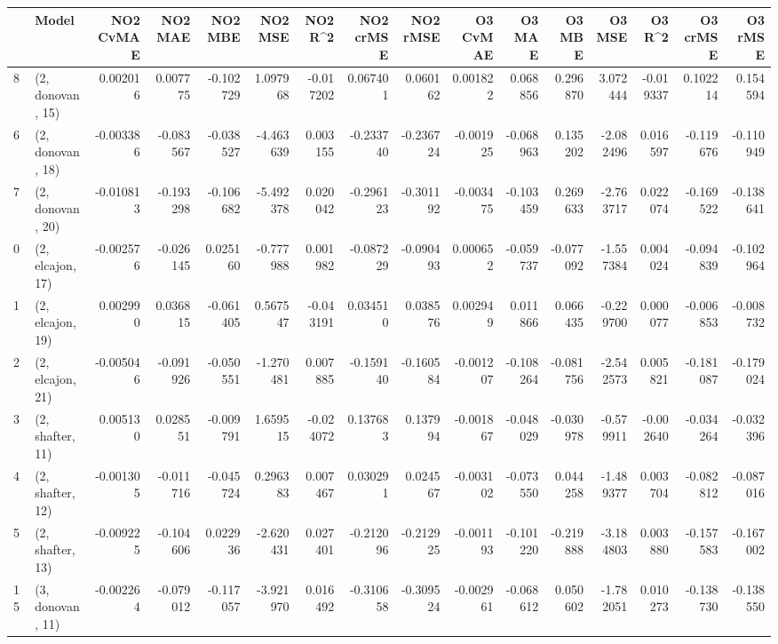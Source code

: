 \begin{tabular}{llrrrrrrrrrrrrrr}
\toprule
{} &             Model &  NO2 CvMAE &   NO2 MAE &   NO2 MBE &    NO2 MSE &   NO2 R\textasciicircum2 &  NO2 crMSE &  NO2 rMSE &  O3 CvMAE &    O3 MAE &    O3 MBE &     O3 MSE &    O3 R\textasciicircum2 &  O3 crMSE &   O3 rMSE \\
\midrule
8  &  (2, donovan, 15) &   0.002016 &  0.007775 & -0.102729 &   1.097968 & -0.017202 &   0.067401 &  0.060162 &  0.001822 &  0.068856 &  0.296870 &   3.072444 & -0.019337 &  0.102214 &  0.154594 \\
6  &  (2, donovan, 18) &  -0.003386 & -0.083567 & -0.038527 &  -4.463639 &  0.003155 &  -0.233740 & -0.236724 & -0.001925 & -0.068963 &  0.135202 &  -2.082496 &  0.016597 & -0.119676 & -0.110949 \\
7  &  (2, donovan, 20) &  -0.010813 & -0.193298 & -0.106682 &  -5.492378 &  0.020042 &  -0.296123 & -0.301192 & -0.003475 & -0.103459 &  0.269633 &  -2.763717 &  0.022074 & -0.169522 & -0.138641 \\
0  &  (2, elcajon, 17) &  -0.002576 & -0.026145 &  0.025160 &  -0.777988 &  0.001982 &  -0.087229 & -0.090493 &  0.000652 & -0.059737 & -0.077092 &  -1.557384 &  0.004024 & -0.094839 & -0.102964 \\
1  &  (2, elcajon, 19) &   0.002990 &  0.036815 & -0.061405 &   0.567547 & -0.043191 &   0.034510 &  0.038576 &  0.002949 &  0.011866 &  0.066435 &  -0.229700 &  0.000077 & -0.006853 & -0.008732 \\
2  &  (2, elcajon, 21) &  -0.005046 & -0.091926 & -0.050551 &  -1.270481 &  0.007885 &  -0.159140 & -0.160584 & -0.001207 & -0.108264 & -0.081756 &  -2.542573 &  0.005821 & -0.181087 & -0.179024 \\
3  &  (2, shafter, 11) &   0.005130 &  0.028551 & -0.009791 &   1.659515 & -0.024072 &   0.137683 &  0.137994 & -0.001867 & -0.048029 & -0.030978 &  -0.579911 & -0.002640 & -0.034264 & -0.032396 \\
4  &  (2, shafter, 12) &  -0.001305 & -0.011716 & -0.045724 &   0.296383 &  0.007467 &   0.030291 &  0.024567 & -0.003102 & -0.073550 &  0.044258 &  -1.489377 &  0.003704 & -0.082812 & -0.087016 \\
5  &  (2, shafter, 13) &  -0.009225 & -0.104606 &  0.022936 &  -2.620431 &  0.027401 &  -0.212096 & -0.212925 & -0.001193 & -0.101220 & -0.219888 &  -3.184803 &  0.003880 & -0.157583 & -0.167002 \\
15 &  (3, donovan, 11) &  -0.002264 & -0.079012 & -0.117057 &  -3.921970 &  0.016492 &  -0.310658 & -0.309524 & -0.002961 & -0.068612 &  0.050602 &  -1.782051 &  0.010273 & -0.138730 & -0.138550 \\

\end{tabular}
